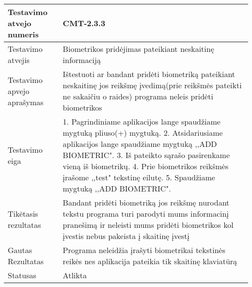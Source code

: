 \documentclass[oneside]{VUMIFPSkursinis}
\begin{document}
\begin{center}
    \begin{tabular}{ |p{5cm}|p{13cm}|}
    \hline
    	Testavimo atvejo numeris & CMT-2.3.3 \\ \hline
    	Testavimo atvejis &Biometrikos pridėjimas pateikiant neskaitinę informaciją \\ \hline
	Testavimo apvejo aprašymas & Ištestuoti ar bandant pridėti biometriką pateikiant neskaitinę jos reikšmę įvedimą(prie reikšmės pateikti ne sakaičiu o raides) programa neleis pridėti biometrikos  \\ \hline
	Testavimo eiga & 1. Pagrindiniame aplikacijos lange spaudžiame mygtuką pliuso(+) mygtuką. 
				2. Atsidariusiame aplikacijos lange spaudžiame mygtuką ,,ADD BIOMETRIC". 
				3. Iš pateikto sąrašo pasirenkame vieną iš biometrikų. 
				4. Prie biometrikos reikšmės įrašome ,,test" tekstinę eilutę. 
				5. Spaudžiame mygtuką ,,ADD BIOMETRIC".\\ \hline
	Tikėtasis rezultatas & Bandant pridėti biometriką jos reikšmę nurodant tekstu programa turi parodyti mums informacinį pranešimą ir neleisti mums pridėti biometrikos kol įvestis nebus pakeista į skaitinę įvestį \\ \hline
	Gautas Rezultatas & Programa neleidžia įrašyti biometrikai tekstinės reikės nes aplikacija pateikia tik skaitinę klaviatūrą \\ \hline
	Statusas & Atlikta \\ \hline
    \hline
    \end{tabular}
\end{center}
\end{document}
